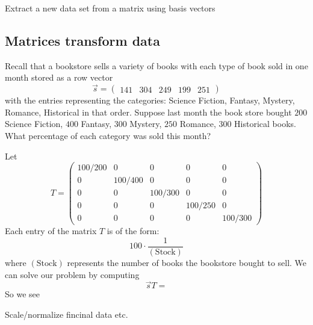\documentclass{ximera}
\begin{document}
\begin{example}
Extract a new data set from a matrix using basis vectors
\end{example}


\begin{example}
\end{example}



\subsection{Matrices transform data}


\begin{example}
  Recall that a bookstore sells a variety of books with each type of
  book sold in one month stored as a row vector
  \[
  \vec{s} = \begin{pmatrix}141 & 304 & 249 & 199 & 251 \end{pmatrix}
  \]
  with the entries representing the categories: Science Fiction,
  Fantasy, Mystery, Romance, Historical in that order.  Suppose last
  month the book store bought $200$ Science Fiction, $400$ Fantasy, $300$
  Mystery, $250$ Romance, $300$ Historical books. What percentage of each
  category was sold this month?
  \begin{explanation}
    Let
    \[
    T =
    \begin{pmatrix}
      100/200 & 0 &    0   &   0    &   0 \\
      0 & 100/400 &    0   &   0    &   0 \\
      0 &   0   &  100/300 &   0    &   0 \\
      0 &   0   &    0   & 100/250  &   0 \\
      0 &   0   &    0   &   0    & 100/300
    \end{pmatrix}
    \]
    Each entry of the matrix $T$ is of the form:
    \[
    100 \cdot \frac{1}{(\text{Stock})}
    \]
    where $(\text{Stock})$ represents the number of books the
    bookstore bought to sell.  We can solve our problem by computing
    \[
    \vec{s} T =
    \]
    So we see
  \end{explanation}

\end{example}




\begin{example}[Navigation]
  Scale/normalize fincinal data etc.
\end{example}
\end{document}
